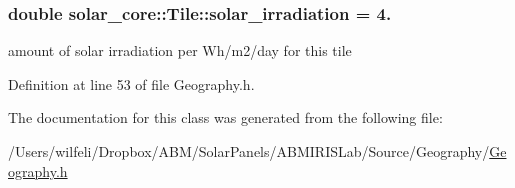 \subsubsection[{solar\+\_\+irradiation}]{\setlength{\rightskip}{0pt plus 5cm}double solar\+\_\+core\+::\+Tile\+::solar\+\_\+irradiation = 4.}\label{classsolar__core_1_1_tile_a2062d4ffe05c6f6282975f71f2d24441}
amount of solar irradiation per Wh/m2/day for this tile 

Definition at line 53 of file Geography.\+h.



The documentation for this class was generated from the following file\+:\begin{DoxyCompactItemize}
\item 
/\+Users/wilfeli/\+Dropbox/\+A\+B\+M/\+Solar\+Panels/\+A\+B\+M\+I\+R\+I\+S\+Lab/\+Source/\+Geography/\hyperlink{_geography_8h}{Geography.\+h}\end{DoxyCompactItemize}
